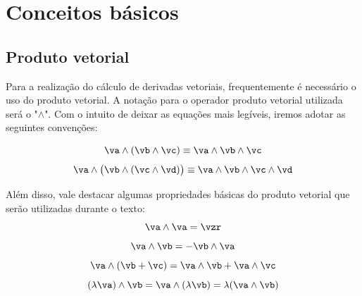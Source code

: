 \documentclass[]{politex}
\begin{document}
\section{Conceitos básicos}
%

\subsection{Produto vetorial}

Para a realização do cálculo de derivadas vetoriais, frequentemente é necessário o uso do produto vetorial. A notação para o operador produto vetorial utilizada será o "$\wedge$". Com o intuito de deixar as equações mais legíveis, iremos adotar as seguintes convenções:

\begin{equation}
\va \wedge (\vb \wedge \vc) \equiv \va \wedge \vb \wedge \vc
\end{equation}
\begin{equation}
\va \wedge \big( \vb \wedge ( \vc \wedge \vd) \big) \equiv \va \wedge \vb \wedge \vc \wedge \vd
\end{equation}

Além disso, vale destacar algumas propriedades básicas do produto vetorial que serão utilizadas durante o texto:
\begin{equation}
\va \wedge \va = \vzr
\end{equation}
\begin{equation}
\va \wedge \vb = -\vb \wedge \va
\end{equation}
\begin{equation}
\va \wedge (\vb + \vc) = \va \wedge \vb + \va \wedge \vc
\end{equation}
\begin{equation}
(\lambda \va) \wedge \vb =  \va \wedge (\lambda \vb) = \lambda (\va \wedge \vb)
\end{equation}
\end{document}
